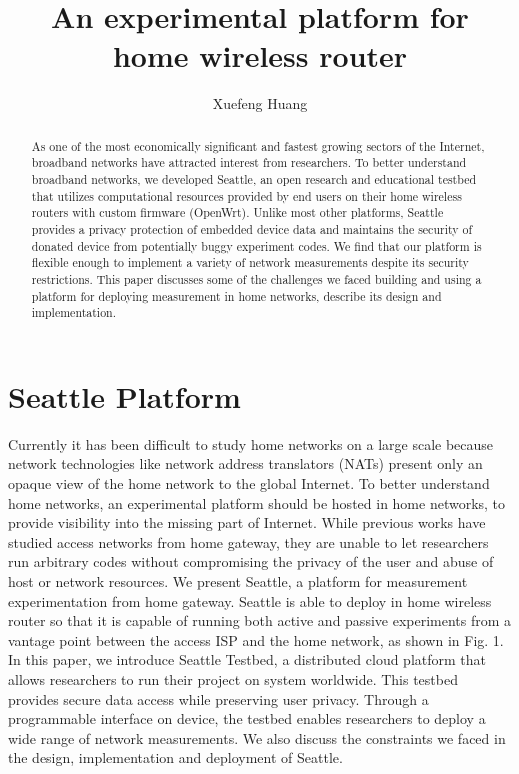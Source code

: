 \documentclass[conference]{IEEEtran}   	%
\title{An experimental platform for home wireless router}
\author{Xuefeng Huang}
\begin{document}
\maketitle
\begin{abstract}
As one of the most economically significant and fastest growing sectors of the Internet, broadband networks have attracted interest from researchers. To better understand broadband networks, we developed Seattle, an open research and educational testbed that utilizes computational resources provided by end users on their home wireless routers with custom firmware (OpenWrt\cite{openwrt}). Unlike most other platforms, Seattle provides a privacy protection of embedded device data and maintains the security of donated device from potentially buggy experiment codes. We find that our platform is flexible enough to implement a variety of network measurements despite its security restrictions. This paper discusses some of the challenges we faced building and using a platform for deploying measurement in home networks, describe its design and implementation.
\end{abstract}
\section{Seattle Platform}
Currently it has been difficult to study home networks on a large scale because network technologies like network address translators (NATs) present only an opaque view of the home network to the global Internet. To better understand home networks, an experimental platform should be hosted in home networks, to provide visibility into the missing part of Internet. While previous works\cite{183951} have studied access networks from home gateway, they are unable to let researchers run arbitrary codes without compromising the privacy of the user and abuse of host or network resources. We present Seattle, a platform for measurement experimentation from home gateway. Seattle is able to deploy in home wireless router so that it is capable of running both active and passive experiments from a vantage point between the access ISP and the home network, as shown in Fig. 1.
\newline
In this paper, we introduce Seattle Testbed\cite{cappos2009seattle}, a distributed cloud platform that allows researchers to run their project on system worldwide. This testbed provides secure data access while preserving user privacy. Through a programmable interface on device, the testbed enables researchers to deploy a wide range of network measurements. We also discuss the constraints we faced in the design, implementation and deployment of Seattle.
\end{document}
